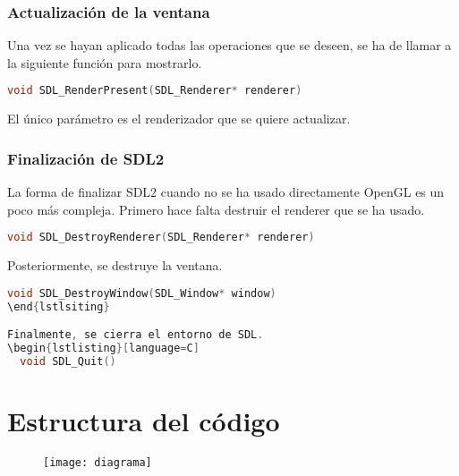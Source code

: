 \subsubsection{Actualización de la ventana}
Una vez se hayan aplicado todas las operaciones que se deseen, se ha de llamar a la siguiente función para mostrarlo.
\begin{lstlisting}[language=C]
  void SDL_RenderPresent(SDL_Renderer* renderer)
\end{lstlisting}
El único parámetro es el renderizador que se quiere actualizar.
\newpage

\subsubsection{Finalización de SDL2}
La forma de finalizar SDL2 cuando no se ha usado directamente OpenGL es un poco más compleja.
Primero hace falta destruir el renderer que se ha usado.
\begin{lstlisting}[language=C]
  void SDL_DestroyRenderer(SDL_Renderer* renderer)
\end{lstlisting}
Posteriormente, se destruye la ventana.
\begin{lstlisting}[language=C]
  void SDL_DestroyWindow(SDL_Window* window)
\end{lstlsiting}

Finalmente, se cierra el entorno de SDL.
\begin{lstlisting}[language=C]
  void SDL_Quit()
\end{lstlisting}

\section{Estructura del código}

\begin{figure}[h]
 \centering
 \texttt{[image: diagrama]}
\end{figure}


